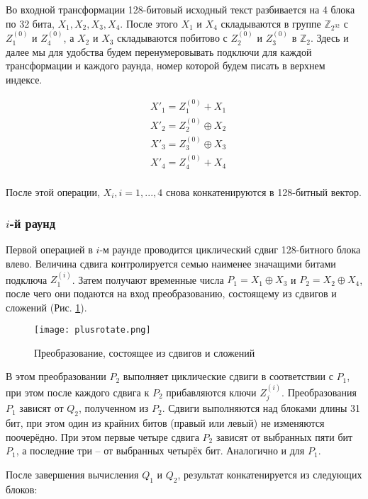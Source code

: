 \documentclass[12pt, a4paper]{article}
\begin{document}
Во входной трансформации 128-битовый исходный текст разбивается на 4 блока по 32 бита, $X_1, X_2, X_3, X_4$. 
После этого $X_1$ и $X_4$ складываются в группе $\mathds{Z}_{2^{32}}$ с $Z_1^{(0)}$ и $Z_4^{(0)}$, а $X_2$ и $X_3$ складываются побитово с $Z_2^{(0)}$ и $Z_3^{(0)}$ в $\mathds{Z}_2$. Здесь и далее мы для удобства будем перенумеровывать подключи для каждой трансформации и каждого раунда, номер которой будем писать в верхнем индексе. 

\begin{equation}
\begin{split}
& X'_1 = Z_1^{(0)} + X_1 \\
& X'_2 = Z_2^{(0)} \oplus X_2 \\
& X'_3 = Z_3^{(0)} \oplus X_3 \\
& X'_4 = Z_4^{(0)} + X_4 \\
\end{split}
\end{equation}

После этой операции, $X_i, i = 1, ..., 4$ снова конкатенируются в 128-битный вектор.

\subsubsection{$i$-й раунд}

Первой операцией в $i$-м раунде проводится циклический сдвиг 128-битного блока влево. Величина сдвига контролируется семью наименее значащими битами подключа $Z_1^{(i)}$. Затем получают временные числа $P_1 = X_1 \oplus X_3$ и $P_2 = X_2 \oplus X_4$, после чего они подаются на вход преобразованию, состоящему из сдвигов и сложений (Рис. \ref{pic:1}).

\begin{figure}[h] 
\label{pic:1}
\texttt{[image: plusrotate.png]}
\caption{Преобразование, состоящее из сдвигов и сложений}
\end{figure}

В этом преобразовании $P_2$ выполняет циклические сдвиги в соответствии с $P_1$, при этом после каждого сдвига к $P_2$ прибавляются ключи $Z_j^{(i)}$. Преобразования $P_1$ зависят от $Q_2$, полученном из $P_2$. Сдвиги выполняются над блоками длины 31 бит, при этом один из крайних битов (правый или левый) не изменяются поочерёдно. При этом первые четыре сдвига $P_2$ зависят от выбранных пяти бит $P_1$, а последние три -- от выбранных четырёх бит. Аналогично и для $P_1$.

После завершения вычисления $Q_1$ и $Q_2$, результат конкатенируется из следующих блоков:
\end{document}
